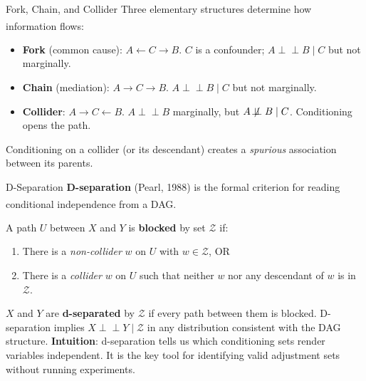 \begin{v3topic}{Fork, Chain, and Collider}
    Three elementary structures determine how information
    flows:\textsuperscript{\cite[][pp.~43--45]{barberBayesianReasoningMachine2012}}

    \begin{itemize}
        \item \textbf{Fork} (common cause): $A \leftarrow C \rightarrow B$.
              $C$ is a confounder; $A \perp\!\!\!\perp B \mid C$ but not marginally.
        \item \textbf{Chain} (mediation): $A \rightarrow C \rightarrow B$.
              $A \perp\!\!\!\perp B \mid C$ but not marginally.
        \item \textbf{Collider}: $A \rightarrow C \leftarrow B$.
              $A \perp\!\!\!\perp B$ marginally, but $A \not\!\perp\!\!\!\perp B \mid C$.
              Conditioning opens the path.
    \end{itemize}

    Conditioning on a collider (or its descendant) creates a \emph{spurious}
    association between its parents.

\end{v3topic}
\begin{v3topic}{D-Separation}
    \textbf{D-separation} (Pearl, 1988) is the formal criterion for reading
    conditional independence from a
    DAG.\textsuperscript{\cite[][pp.~45--46]{barberBayesianReasoningMachine2012}}

    A path $U$ between $X$ and $Y$ is \textbf{blocked} by set $\mathcal{Z}$ if:
    \begin{enumerate}
        \item There is a \emph{non-collider} $w$ on $U$ with $w \in \mathcal{Z}$, OR
        \item There is a \emph{collider} $w$ on $U$ such that neither $w$ nor
              any descendant of $w$ is in $\mathcal{Z}$.
    \end{enumerate}

    $X$ and $Y$ are \textbf{d-separated} by $\mathcal{Z}$ if every path between
    them is blocked. D-separation implies $X \perp\!\!\!\perp Y \mid \mathcal{Z}$
    in any distribution consistent with the DAG structure.
\visualseparator
    \textbf{Intuition}: d-separation tells us which conditioning sets render
    variables independent. It is the key tool for identifying valid adjustment
    sets without running experiments.

\end{v3topic}

